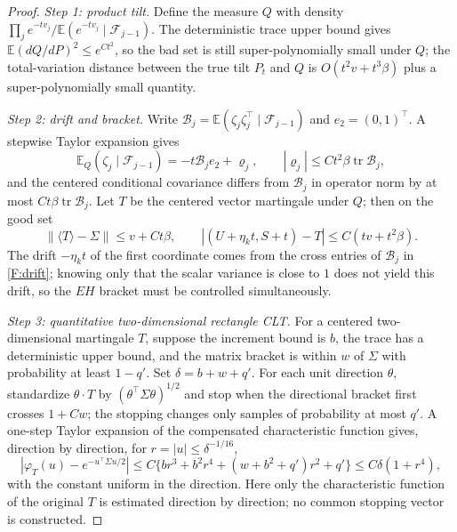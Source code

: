 \documentclass[a4paper,11pt]{article}
\numberwithin{equation}{section}
\newcommand{\E}{\mathbb E}
\begin{document}
\begin{proof}
\emph{Step 1: product tilt.} Define the measure $Q$ with density
$\prod_je^{-tv_j}/\E(e^{-tv_j}\mid\mathcal F_{j-1})$. The deterministic trace upper bound gives
$\E(dQ/dP)^2\le e^{Ct^2}$, so the bad set is still super-polynomially small under $Q$; the total-variation
distance between the true tilt $P_t$ and $Q$ is $O(t^2v+t^3\beta)$ plus a super-polynomially small quantity.

\emph{Step 2: drift and bracket.} Write $\mathcal B_j=\E(\zeta_j\zeta_j^\top\mid\mathcal F_{j-1})$ and
$e_2=(0,1)^\top$. A stepwise Taylor expansion gives
\begin{equation}
\E_Q(\zeta_j\mid\mathcal F_{j-1})=-t\mathcal B_je_2+\varrho_j,\qquad|\varrho_j|\le Ct^2\beta\operatorname{tr}\mathcal B_j,\label{F:drift}
\end{equation}
and the centered conditional covariance differs from $\mathcal B_j$ in operator norm by at most
$Ct\beta\operatorname{tr}\mathcal B_j$. Let $T$ be the centered vector martingale under $Q$; then on the good
set
\[
\|\langle T\rangle-\Sigma\|\le v+Ct\beta,\qquad|(U+\eta_kt,S+t)-T|\le C(tv+t^2\beta).
\]
The drift $-\eta_kt$ of the first coordinate comes from the cross entries of $\mathcal B_j$ in
\eqref{F:drift}; knowing only that the scalar variance is close to $1$ does not yield this drift, so the $EH$
bracket must be controlled simultaneously.

\emph{Step 3: quantitative two-dimensional rectangle CLT.} For a centered two-dimensional martingale $T$,
suppose the increment bound is $b$, the trace has a deterministic upper bound, and the matrix bracket is within
$w$ of $\Sigma$ with probability at least $1-q'$. Set $\delta=b+w+q'$. For each unit direction $\theta$,
standardize $\theta\cdot T$ by $(\theta^\top\Sigma\theta)^{1/2}$ and stop when the directional bracket first
crosses $1+Cw$; the stopping changes only samples of probability at most $q'$. A one-step Taylor expansion of
the compensated characteristic function gives, direction by direction, for $r=|u|\le\delta^{-1/16}$,
\[
|\varphi_T(u)-e^{-u^\top\Sigma u/2}|\le C\{br^3+b^2r^4+(w+b^2+q')r^2+q'\}\le C\delta(1+r^4),
\]
with the constant uniform in the direction. Here only the characteristic function of the original $T$ is
estimated direction by direction; no common stopping vector is constructed.


\end{proof}
\end{document}
